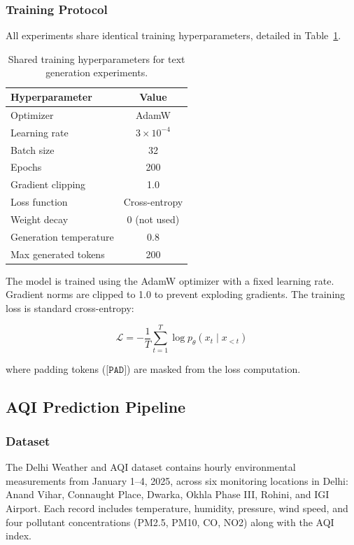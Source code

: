 \documentclass[conference]{IEEEtran}
\begin{document}
\subsubsection{Training Protocol}

All experiments share identical training hyperparameters, detailed in Table~\ref{tab:train_hp}.

\begin{table}[t]
\centering
\caption{Shared training hyperparameters for text generation experiments.}
\label{tab:train_hp}
\begin{tabular}{lc}
\toprule
\textbf{Hyperparameter} & \textbf{Value} \\
\midrule
Optimizer & AdamW \\
Learning rate & $3 \times 10^{-4}$ \\
Batch size & 32 \\
Epochs & 200 \\
Gradient clipping & 1.0 \\
Loss function & Cross-entropy \\
Weight decay & 0 (not used) \\
\midrule
Generation temperature & 0.8 \\
Max generated tokens & 200 \\
\bottomrule
\end{tabular}
\end{table}

The model is trained using the AdamW optimizer with a fixed learning rate. Gradient norms are clipped to 1.0 to prevent exploding gradients. The training loss is standard cross-entropy:

\begin{equation}
\mathcal{L} = -\frac{1}{T}\sum_{t=1}^T \log p_\theta(x_t \mid x_{<t})
\end{equation}

where padding tokens ($\texttt{[PAD]}$) are masked from the loss computation.

\subsection{AQI Prediction Pipeline}

\subsubsection{Dataset}

The Delhi Weather and AQI dataset contains hourly environmental measurements from January 1--4, 2025, across six monitoring locations in Delhi: Anand Vihar, Connaught Place, Dwarka, Okhla Phase III, Rohini, and IGI Airport. Each record includes temperature, humidity, pressure, wind speed, and four pollutant concentrations (PM2.5, PM10, CO, NO2) along with the AQI index.
\end{document}
